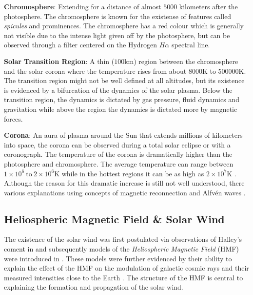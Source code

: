 

\textbf{Chromosphere}: Extending for a distance of almost $5000$ kilometers after the photosphere. The chromosphere is 
known for the existense of features called \emph{spicules} and prominences. The chromosphere has a red colour which 
is generally not visible due to the intense light given off by the photosphere, but can be observed through 
a filter centered on the Hydrogen $H\alpha$ spectral line. %

\textbf{Solar Transition Region}: A thin ($100 \text{km}$) region between the chromosphere and the solar corona 
where the temperature rises from about $8000 \text{K}$ to $500000 \text{K}$. The transition region might not be well 
defined at all altitudes, but its existence is evidenced by a bifurcation of the dynamics of the solar plasma. 
Below the transition region, the dynamics is dictated by gas pressure, fluid dynamics and gravitation while 
above the region the dynamics is dictated more by magnetic forces.

\textbf{Corona}: An aura of plasma around the Sun that extends millions of kilometers into space, the corona can be 
observed during a total solar eclipse or with a coronograph. The temperature of the corona is dramatically higher 
than the photosphere and chromosphere. The average temperature can range between 
$1 \times 10^6 \ \text{to} \ 2 \times 10^6 \text{K}$ while in the hottest regions it can be as high as 
$2 \times 10^7 \text{K}$ \citep{SolarCorona}. Although the reason for this dramatic increase is still 
not well understood, there various explanations using concepts of magnetic reconnection 
\citep{russell2001solar,SolarCorona} and Alfv\'en waves \citep{AlfvenCorona}.


\subsection{Heliospheric Magnetic Field \& Solar Wind}\label{sec:hmfsolarwind}

The existence of the solar wind was first postulated via observations of Halley's coment in 
\citet{Bierman1,Bierman2,Bierman3} and subsequently models of the \emph{Heliospheric Magnetic Field} (HMF) 
were introduced in \citet{parker1958dynamics}. These models were further evidenced by their ability 
to explain the effect of the HMF on the modulation of galactic cosmic rays and their measured intensities 
close to the Earth \citep{ParkerSolarWind}. The structure of the HMF is central to explaining 
the formation and propagation of the solar wind. 

